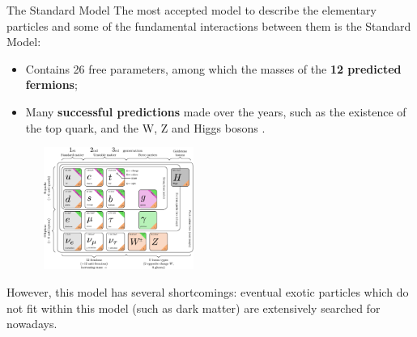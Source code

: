 \documentclass[8pt]{beamer}
\begin{document}
\begin{frame}{The Standard Model}
\justifying
The most accepted model to describe the elementary particles and some of the fundamental interactions between them is the \alert{Standard Model}:

\begin{itemize}
\justifying
\item Contains 26 free parameters, among which the masses of the \textbf{12 predicted fermions};
\item Many \textbf{successful predictions} made over the years, such as the existence of the top quark, and the W, Z and Higgs bosons \cite{SMPredictions}.
\end{itemize} \vfill

\begin{figure}[htbp]
\begin{center}
\includegraphics[width=5.2cm, height=4cm]{figs/SMFermions.png}
\end{center}
\end{figure} \vfill

However, this model \alert{has several shortcomings}: eventual exotic particles which do not fit within this model (such as dark matter) are extensively searched for nowadays. \vfill
\end{frame}
\end{document}
